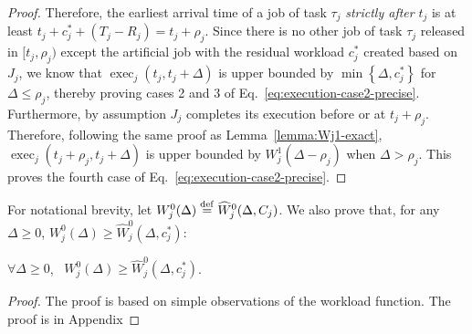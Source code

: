 \begin{proof}
  Therefore, the earliest arrival time of a job of task $\tau_j$
  \emph{strictly after} $t_j$ is at least $t_j + c_j^* + (T_j-R_j) = t_j+\rho_j$. Since there is no other job of task $\tau_j$ released in $[t_j, \rho_j)$ except the artificial job with the residual workload $c_j^*$ created based on $J_j$, we know that 
$\operatorname{exec}_j(t_j, t_j+\Delta)$ is upper bounded by $\min\left\{ \Delta, c_j^* \right\}$ for $\Delta \leq \rho_j$, thereby proving cases 2 and 3 of Eq.~\eqref{eq:execution-case2-precise}. Furthermore, by assumption $J_j$ completes its execution before or at $t_j + \rho_j$. Therefore, following the same proof as Lemma~\ref{lemma:Wj1-exact}, $\operatorname{exec}_j(t_j + \rho_j, t_j + \Delta)$ is upper bounded by $W_j^1(\Delta -\rho_j)$ when $\Delta > \rho_j$. This proves the fourth case of Eq.~\eqref{eq:execution-case2-precise}.
\end{proof}

For notational brevity, let $W_j^0(\Delta)\stackrel{\mathrm{def}}{=} \widehat{W}_j^0(\Delta, C_j)$. We also prove that, for any $\Delta \geq 0$, $W_j^0(\Delta) \geq \widehat{W}_j^0(\Delta, c_j^*)$:
\begin{Lemma}
\label{lemma:Wj0-dominate}
$\forall \Delta \geq 0$,~ $W_j^0(\Delta) \geq \widehat{W}_j^0(\Delta, c_j^*)$.
\end{Lemma}
\begin{proof}
 The proof is based on simple observations of the workload function. The proof is in Appendix
\end{proof}



